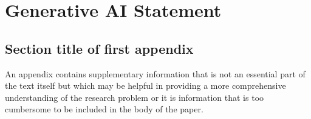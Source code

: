 \documentclass[pdflatex,sn-mathphys-num, oneside]{sn-jnl}%
\theoremstyle{thmstyleone}%
\theoremstyle{thmstyletwo}%
\theoremstyle{thmstylethree}%
\begin{document}
\clearpage


\clearpage

\section{Generative AI Statement}

\clearpage

\begin{appendices}

\section{Section title of first appendix}\label{secA1}

An appendix contains supplementary information that is not an essential part of the text itself but which may be helpful in providing a more comprehensive understanding of the research problem or it is information that is too cumbersome to be included in the body of the paper.




\end{appendices}

\end{document}
